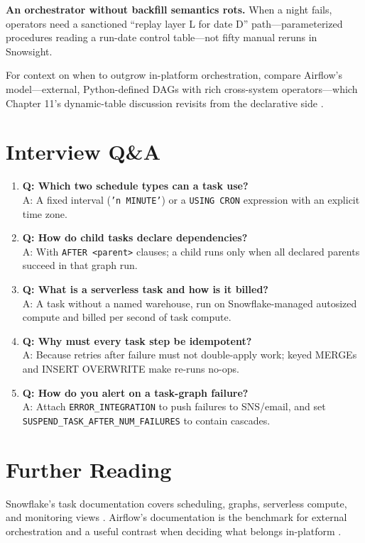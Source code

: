 \begin{pitfall}
\textbf{An orchestrator without backfill semantics rots.} When a night fails, operators need a sanctioned ``replay layer L for date D'' path---parameterized procedures reading a run-date control table---not fifty manual reruns in Snowsight.
\end{pitfall}

For context on when to outgrow in-platform orchestration, compare Airflow's model---external, Python-defined DAGs with rich cross-system operators---which Chapter 11's dynamic-table discussion revisits from the declarative side \cite{airflowDocs}.

\section{Interview Q\&A}
\begin{enumerate}
    \item \textbf{Q: Which two schedule types can a task use?}\\
    A: A fixed interval (\texttt{'n MINUTE'}) or a \texttt{USING CRON} expression with an explicit time zone.
    \item \textbf{Q: How do child tasks declare dependencies?}\\
    A: With \texttt{AFTER <parent>} clauses; a child runs only when all declared parents succeed in that graph run.
    \item \textbf{Q: What is a serverless task and how is it billed?}\\
    A: A task without a named warehouse, run on Snowflake-managed autosized compute and billed per second of task compute.
    \item \textbf{Q: Why must every task step be idempotent?}\\
    A: Because retries after failure must not double-apply work; keyed MERGEs and INSERT OVERWRITE make re-runs no-ops.
    \item \textbf{Q: How do you alert on a task-graph failure?}\\
    A: Attach \texttt{ERROR\_INTEGRATION} to push failures to SNS/email, and set \texttt{SUSPEND\_TASK\_AFTER\_NUM\_FAILURES} to contain cascades.
\end{enumerate}

\section{Further Reading}
Snowflake's task documentation covers scheduling, graphs, serverless compute, and monitoring views \cite{snowflakeTasksDocs,snowflakeAlertsDocs}. Airflow's documentation is the benchmark for external orchestration and a useful contrast when deciding what belongs in-platform \cite{airflowDocs}.

